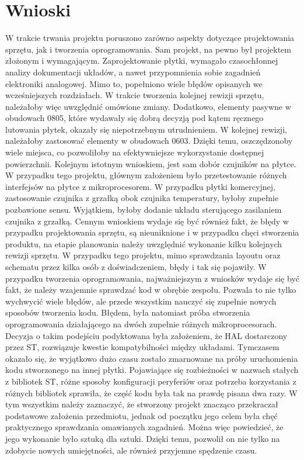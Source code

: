\chapter{Wnioski}
\label{cha:results}
W trakcie trwania projektu poruszono zarówno aspekty dotyczące projektowania sprzętu, jak i tworzenia oprogramowania. Sam projekt, na pewno był projektem złożonym i wymagającym. Zaprojektowanie płytki, wymagało czasochłonnej analizy dokumentacji układów, a nawet przypomnienia sobie zagadnień elektroniki analogowej. Mimo to, popełniono wiele błędów opisanych we wcześniejszych rozdziałach. W trakcie tworzenia kolejnej rewizji sprzętu, należałoby więc uwzględnić omówione zmiany. Dodatkowo, elementy pasywne w obudowach 0805, które wydawały się dobrą decyzją pod kątem ręcznego lutowania płytek, okazały się niepotrzebnym utrudnieniem. W kolejnej rewizji, należałoby zastosować elementy w obudowach 0603. Dzięki temu, oszczędzonoby wiele miejsca, co pozwoliłoby na efektywniejsze wykorzystanie dostępnej powierzchnii. Kolejnym istotnym wnioskiem, jest sam dobór czujników na płytce. W przypadku tego projektu, głównym założeniem było przetestowanie różnych interfejsów na płytce z mikroprocesorem. W przypadku płytki komercyjnej, zastosowanie czujnika z grzałką obok czujnika temperatury, byłoby zupełnie pozbawione sensu. Wyjątkiem, byłoby dodanie układu sterującego zasilaniem czujnika z grzałką. Cennym wnioskiem wydaje się być również fakt, że błędy w przypadku projektowania sprzętu, są nieuniknione i w przypadku chęci stworzenia produktu, na etapie planowania należy uwzględnić wykonanie kilku kolejnych rewizji sprzętu. W przypadku tego projektu, mimo sprawdzania layoutu oraz schematu przez kilka osób z doświadczeniem, błędy i tak się pojawiły. W przypadku tworzenia oprogramowania, najważniejszym z wniosków wydaje się być fakt, że należy wzajemnie sprawdzać kod w obrębie zespołu. Pozwala to nie tylko wychwycić wiele błędów, ale przede wszystkim nauczyć się zupełnie nowych sposobów tworzenia kodu. Błędem, była natomiast próba stworzenia oprogramowania działającego na dwóch zupełnie różnych mikroprocesorach. Decyzja o takim podejściu podyktowana była założeniem, że HAL dostarczony przez ST, rozwiązuje kwestie kompatybilności między układami. Tymczasem okazało się, że wyjątkowo dużo czasu zostało zmarnowane na próby uruchomienia kodu stworzonego na innej płytki. Pojawiające się rozbieżności w nazwach stałych z bibliotek ST, różne sposoby konfiguracji peryferiów oraz potrzeba korzystania z różnych bibliotek sprawiła, że część kodu była tak na prawdę pisana dwa razy.\newline
W tym wszystkim należy zaznaczyć, że stworzony projekt znacząco przekraczał podstawowe założenia przedmiotu, jednak od początku jego celem była chęć praktycznego sprawdzania omawianych zagadnień. Można więc powiedzieć, że jego wykonanie było sztuką dla sztuki. Dzięki temu, pozwolił on nie tylko na zdobycie nowych umiejętności, ale również przyjemne spędzenie czasu.
